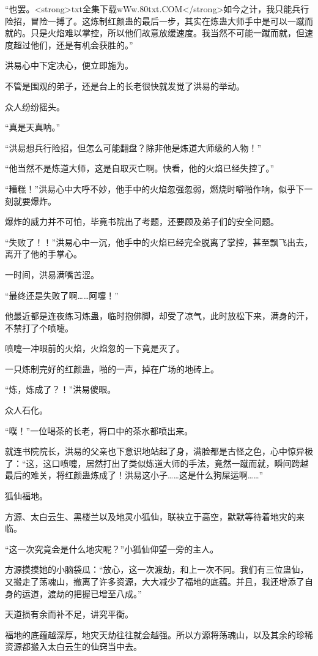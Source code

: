 \begin{this_body}
“也罢。<strong>txt全集下载wWw.80txt.COM</strong>如今之计，我只能兵行险招，冒险一搏了。这炼制红颜蛊的最后一步，其实在炼蛊大师手中是可以一蹴而就的。只是火焰难以掌控，所以他们故意放缓速度。我当然不可能一蹴而就，但速度超过他们，还是有机会获胜的。”

洪易心中下定决心，便立即施为。

不管是围观的弟子，还是台上的长老很快就发觉了洪易的举动。

众人纷纷摇头。

“真是天真呐。”

“洪易想兵行险招，但怎么可能翻盘？除非他是炼道大师级的人物！”

“他当然不是炼道大师，这是自取灭亡啊。快看，他的火焰已经失控了。”

“糟糕！”洪易心中大呼不妙，他手中的火焰忽强忽弱，燃烧时噼啪作响，似乎下一刻就要爆炸。

爆炸的威力并不可怕，毕竟书院出了考题，还要顾及弟子们的安全问题。

“失败了！！”洪易心中一沉，他手中的火焰已经完全脱离了掌控，甚至飘飞出去，离开了他的手掌心。

一时间，洪易满嘴苦涩。

“最终还是失败了啊……阿嚏！”

他最近都是连夜练习炼蛊，临时抱佛脚，却受了凉气，此时放松下来，满身的汗，不禁打了个喷嚏。

喷嚏一冲眼前的火焰，火焰忽的一下竟是灭了。

一只炼制完好的红颜蛊，啪的一声，掉在广场的地砖上。

“炼，炼成了？！”洪易傻眼。

众人石化。

“噗！”一位喝茶的长老，将口中的茶水都喷出来。

就连书院院长，洪易的父亲也下意识地站起了身，满脸都是古怪之色，心中惊异极了：“这，这口喷嚏，居然打出了类似炼道大师的手法，竟然一蹴而就，瞬间跨越最后的难关，将红颜蛊炼成了！洪易这小子……这是什么狗屎运啊……”

狐仙福地。

方源、太白云生、黑楼兰以及地灵小狐仙，联袂立于高空，默默等待着地灾的来临。

“这一次究竟会是什么地灾呢？”小狐仙仰望一旁的主人。

方源摸摸她的小脑袋瓜：“放心，这一次渡劫，和上一次不同。我们有三位蛊仙，又搬走了荡魂山，撤离了许多资源，大大减少了福地的底蕴。并且，我还增添了自身的运道，渡劫的把握已增至八成。”

天道损有余而补不足，讲究平衡。

福地的底蕴越深厚，地灾天劫往往就会越强。所以方源将荡魂山，以及其余的珍稀资源都搬入太白云生的仙窍当中去。


\end{this_body}
